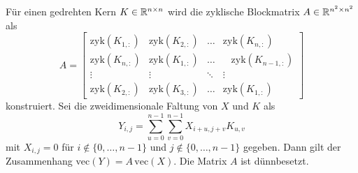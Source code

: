 \begin{lem}
    Für einen gedrehten Kern $K \in \mathbb{R}^{n \times n}$ wird die zyklische Blockmatrix $A \in \mathbb{R}^{n^2 \times n^2}$ als
    \begin{equation*}
        A=\begin{bmatrix}
            \mathrm{zyk}(K_{1,:}) &\mathrm{zyk}(K_{2,:}) &\ldots &\mathrm{zyk}(K_{n,:}) \\
            \mathrm{zyk}(K_{n,:}) &\mathrm{zyk}(K_{1,:}) &\ldots & \; \; \;\mathrm{zyk}(K_{n-1,:})\\
            \vdots &\vdots &\ddots &\vdots\\
            \mathrm{zyk}(K_{2,:}) &\mathrm{zyk}(K_{3,:}) &\ldots &\mathrm{zyk}(K_{1,:})
        \end{bmatrix}
    \end{equation*}
    konstruiert. Sei die zweidimensionale Faltung von $X$ und $K$ als
    \begin{equation*}
        Y_{i,j}= \sum_{u=0}^{n-1} \sum _{v=0}^{n-1} X_{i+u,j+v} K_{u,v} 
    \end{equation*}
    mit $X_{i,j}=0$ für $i \notin\{0,\ldots, n-1\}$ und $j \notin \{0, \ldots, n-1\}$ gegeben. Dann gilt der Zusammenhang
    $\mathrm{vec}(Y)=A \, \mathrm{vec}(X)$. Die Matrix $A$ ist dünnbesetzt. 
\end{lem}

